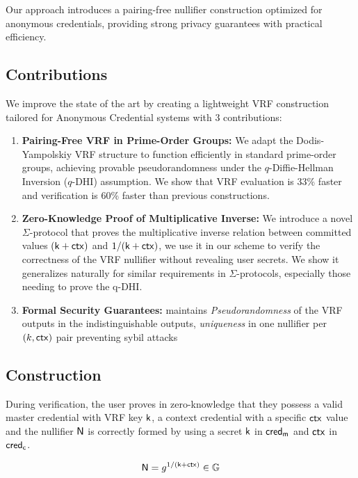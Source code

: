 Our approach introduces a pairing-free nullifier construction optimized for anonymous credentials, providing strong privacy guarantees with practical efficiency.


\subsection{Contributions}

\noindent We improve the state of the art by creating a lightweight VRF construction tailored for Anonymous Credential systems with 3 contributions:
\begin{enumerate}
        \item \textbf{Pairing-Free VRF in Prime-Order Groups:} We adapt the Dodis-Yampolskiy VRF structure to function efficiently in standard prime-order groups, achieving provable pseudorandomness under the $q$-Diffie-Hellman Inversion ($q$-DHI) assumption. We show that VRF evaluation is 33\% faster and verification is 60\% faster than previous constructions.

        \item \textbf{Zero-Knowledge Proof of Multiplicative Inverse:} We introduce a novel $\Sigma$-protocol that proves the multiplicative inverse relation between committed values $(\mathsf{k} + \mathsf{ctx})$ and $1/(\mathsf{k} + \mathsf{ctx})$, we use it in our scheme to verify the correctness of the VRF nullifier without revealing user secrets. We show it generalizes naturally for similar requirements in $\Sigma$-protocols, especially those needing to prove the q-DHI.

         \item \textbf{Formal Security Guarantees:} maintains \emph{Pseudorandomness} of the VRF outputs in the indistinguishable outputs, \emph{uniqueness} in one nullifier per $(k, \mathsf{ctx})$ pair preventing sybil attacks

\end{enumerate}





\subsection{Construction}
During verification, the user proves in zero-knowledge that they possess a valid master credential with VRF key $\mathsf{k}$, a context credential with a specific $\mathsf{ctx}$ value and the nullifier $\mathsf{N}$ is correctly formed by using a secret $\mathsf{k}$ in $\mathsf{cred_m}$ and $\mathsf{ctx}$ in $\mathsf{cred_c}$. 

\begin{equation}
\mathsf{N} = g^{1/(\mathsf{k} + \mathsf{ctx})} \in \mathbb{G}
\end{equation}

